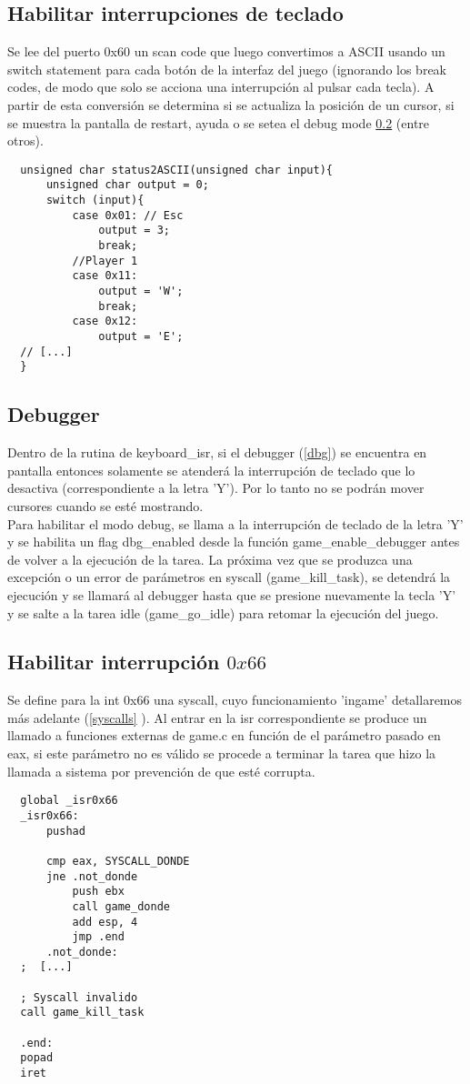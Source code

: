 \subsection{Habilitar interrupciones de teclado}
Se lee del puerto 0x60 un scan code que luego convertimos a ASCII usando un switch statement para cada botón de la interfaz del juego (ignorando los break codes, de modo que solo se acciona una interrupción al pulsar cada tecla).
A partir de esta conversión se determina si se actualiza la posición de un cursor, si se muestra la pantalla de restart, ayuda o se setea el debug mode \ref{isr_dbg} (entre otros).

\begin{lstlisting}
  unsigned char status2ASCII(unsigned char input){
      unsigned char output = 0;
      switch (input){
          case 0x01: // Esc
              output = 3;
              break;
          //Player 1
          case 0x11:
              output = 'W';
              break;
          case 0x12:
              output = 'E';
  // [...]
  }
\end{lstlisting}


\subsection{Debugger}
\label{isr_dbg}
Dentro de la rutina de keyboard_isr, si el debugger (\ref{dbg}) se encuentra en pantalla entonces solamente se atenderá la interrupción de teclado que lo desactiva (correspondiente a la letra 'Y').
Por lo tanto no se podrán mover cursores cuando se esté mostrando.\\
Para habilitar el modo debug, se llama a la interrupción de teclado de la letra 'Y' y se habilita un flag dbg_enabled desde la función game_enable_debugger antes de volver a la ejecución de la tarea. La próxima vez que se produzca una excepción o un error de parámetros en syscall (game_kill_task), se detendrá la ejecución y se llamará al debugger hasta que se presione nuevamente la tecla 'Y' y se salte a la tarea idle (game_go_idle) para retomar la ejecución del juego.

\subsection{Habilitar interrupción $0x66$}
Se define para la int 0x66 una syscall, cuyo funcionamiento 'ingame' detallaremos más adelante (\ref{syscalls} ).
Al entrar en la isr correspondiente se produce un llamado a funciones externas de game.c en función de el parámetro pasado en eax, si este parámetro no es válido se procede a terminar la tarea que hizo la llamada a sistema por prevención de que esté corrupta.
\begin{lstlisting}
  global _isr0x66
  _isr0x66:
      pushad

      cmp eax, SYSCALL_DONDE
      jne .not_donde
          push ebx
          call game_donde
          add esp, 4
          jmp .end
      .not_donde:
  ;  [...]

  ; Syscall invalido
  call game_kill_task

  .end:
  popad
  iret

\end{lstlisting}
